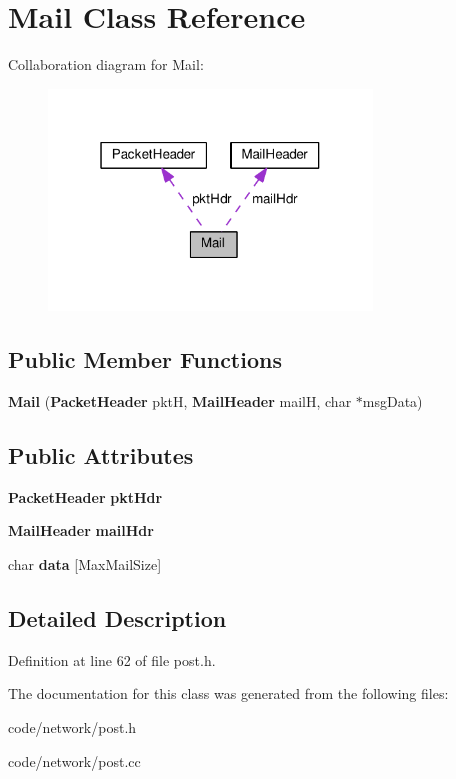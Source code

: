 \section{Mail Class Reference}
\label{class_mail}


Collaboration diagram for Mail\+:\nopagebreak
\begin{figure}[H]
\begin{center}
\leavevmode
\includegraphics[width=244pt]{class_mail__coll__graph}
\end{center}
\end{figure}
\subsection*{Public Member Functions}
\begin{DoxyCompactItemize}
\item 
{\bfseries Mail} ({\bf Packet\+Header} pktH, {\bf Mail\+Header} mailH, char $\ast$msg\+Data)\label{class_mail_a25507f11e0e61e0bc84b6667650a9090}

\end{DoxyCompactItemize}
\subsection*{Public Attributes}
\begin{DoxyCompactItemize}
\item 
{\bf Packet\+Header} {\bfseries pkt\+Hdr}\label{class_mail_a7309e530849e6c8344975eaba744af5f}

\item 
{\bf Mail\+Header} {\bfseries mail\+Hdr}\label{class_mail_a1409880dfb35487ddb6d7373a4322281}

\item 
char {\bfseries data} [Max\+Mail\+Size]\label{class_mail_a6c05d7e6f61ab0c8e085690923ee7e93}

\end{DoxyCompactItemize}


\subsection{Detailed Description}


Definition at line 62 of file post.\+h.



The documentation for this class was generated from the following files\+:\begin{DoxyCompactItemize}
\item 
code/network/post.\+h\item 
code/network/post.\+cc\end{DoxyCompactItemize}
